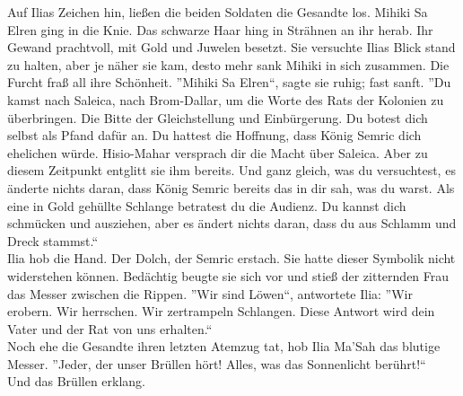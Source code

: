 Auf Ilias Zeichen hin, ließen die beiden Soldaten die Gesandte los. Mihiki Sa Elren ging in die 
Knie. Das schwarze Haar hing in Strähnen an ihr herab. Ihr Gewand prachtvoll, mit Gold und Juwelen 
besetzt. Sie versuchte Ilias Blick stand zu halten, aber je näher sie kam, desto mehr sank Mihiki 
in sich zusammen. Die Furcht fraß all ihre Schönheit. 
''Mihiki Sa Elren``, sagte sie ruhig; fast sanft. ''Du kamst nach Saleica, nach Brom-Dallar, um die 
Worte des Rats der Kolonien zu überbringen. Die Bitte der Gleichstellung und Einbürgerung. Du 
botest dich selbst als Pfand dafür an. Du hattest die Hoffnung, dass König Semric dich 
ehelichen würde. Hisio-Mahar versprach dir die Macht über Saleica. Aber zu diesem Zeitpunkt 
entglitt sie ihm bereits. Und ganz gleich, was du versuchtest, es änderte nichts daran, dass 
König Semric bereits das in dir sah, was du warst. Als eine in Gold gehüllte Schlange betratest 
du die Audienz. Du kannst dich schmücken und ausziehen, aber es ändert nichts 
daran, dass du aus Schlamm und Dreck stammst.``\\
Ilia hob die Hand. Der Dolch, der Semric erstach. Sie hatte dieser Symbolik nicht widerstehen 
können. Bedächtig beugte sie sich vor und stieß der zitternden Frau das Messer zwischen die Rippen. 
''Wir sind Löwen``, antwortete Ilia: ''Wir erobern. Wir herrschen. Wir zertrampeln Schlangen. Diese 
Antwort wird dein Vater und der Rat von uns erhalten.``\\
Noch ehe die Gesandte ihren letzten Atemzug tat, hob Ilia Ma'Sah das blutige Messer. ''Jeder, der 
unser Brüllen hört! Alles, was das Sonnenlicht berührt!``\\
Und das Brüllen erklang.\\





